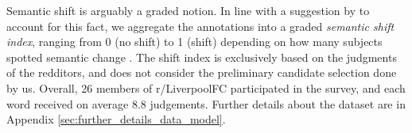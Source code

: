 Semantic shift is arguably a graded notion. In line with a suggestion by  to account for this fact, we aggregate the annotations into a graded \emph{semantic shift index},
ranging from 0 (no shift) to 1 (shift) depending on how many subjects
spotted semantic change . The shift index is exclusively based
  on the judgments of the redditors, and does not consider the
  preliminary candidate selection done by us.  Overall, 26 members
of r/LiverpoolFC participated in the survey, and each word received on
average 8.8 judgements. 
  Further details about the dataset are in Appendix \ref{sec:further_details_data_model}. 



